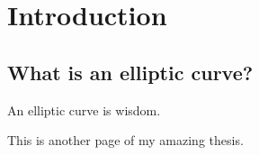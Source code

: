 \chapter{Introduction}%
\label{sec:introduction}

\section{What is an elliptic curve?}

An elliptic curve is wisdom. ~\cite{Example}

\pagebreak

This is another page of my amazing thesis.